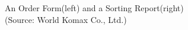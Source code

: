 \begin{figure}[h!]
	\centering
	\caption{An Order Form(left) and a Sorting Report(right) \\(Source: World Komax Co., Ltd.)}
	\label{fig:Order_Sorting}       %
\end{figure}

